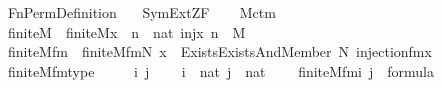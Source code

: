 %
\begin{isabellebody}%
%
%
\isadelimtheory
%
\endisadelimtheory
%
\isatagtheory
{}\isamarkupfalse%
\ Fn{\isacharunderscore}{\kern0pt}Perm{\isacharunderscore}{\kern0pt}Definition\isanewline
\ \ \ SymExt{\isacharunderscore}{\kern0pt}ZF\ \isanewline
{}%
\endisatagtheory
{\isafoldtheory}%
%
\isadelimtheory
\ \isanewline
%
\endisadelimtheory
\isanewline
{}\isamarkupfalse%
\ M{\isacharunderscore}{\kern0pt}ctm\ \ \isanewline
\isanewline
{}\isamarkupfalse%
\ finite{\isacharunderscore}{\kern0pt}M\ \ {\isachardoublequoteopen}finite{\isacharunderscore}{\kern0pt}M{\isacharparenleft}{\kern0pt}x{\isacharparenright}{\kern0pt}\ {\isasymequiv}\ {\isasymexists}n\ {\isasymin}\ nat{\isachardot}{\kern0pt}\ inj{\isacharparenleft}{\kern0pt}x{\isacharcomma}{\kern0pt}\ n{\isacharparenright}{\kern0pt}\ {\isasyminter}\ M\ {\isasymnoteq}\ {}{\isachardoublequoteclose}\ \ \isanewline
{}\isamarkupfalse%
\ finite{\isacharunderscore}{\kern0pt}M{\isacharunderscore}{\kern0pt}fm\ \ {\isachardoublequoteopen}finite{\isacharunderscore}{\kern0pt}M{\isacharunderscore}{\kern0pt}fm{\isacharparenleft}{\kern0pt}N{\isacharcomma}{\kern0pt}\ x{\isacharparenright}{\kern0pt}\ {\isasymequiv}\ Exists{\isacharparenleft}{\kern0pt}Exists{\isacharparenleft}{\kern0pt}And{\isacharparenleft}{\kern0pt}Member{\isacharparenleft}{\kern0pt}{}{\isacharcomma}{\kern0pt}\ N{\isacharhash}{\kern0pt}{\isacharplus}{\kern0pt}{}{\isacharparenright}{\kern0pt}{\isacharcomma}{\kern0pt}\ injection{\isacharunderscore}{\kern0pt}fm{\isacharparenleft}{\kern0pt}x{\isacharhash}{\kern0pt}{\isacharplus}{\kern0pt}{}{\isacharcomma}{\kern0pt}\ {}{\isacharcomma}{\kern0pt}\ {}{\isacharparenright}{\kern0pt}{\isacharparenright}{\kern0pt}{\isacharparenright}{\kern0pt}{\isacharparenright}{\kern0pt}{\isachardoublequoteclose}\isanewline
\isanewline
{}\isamarkupfalse%
\ finite{\isacharunderscore}{\kern0pt}M{\isacharunderscore}{\kern0pt}fm{\isacharunderscore}{\kern0pt}type\ {\isacharcolon}{\kern0pt}\ \isanewline
\ \ \ i\ j\ \isanewline
\ \ \ {\isachardoublequoteopen}i\ {\isasymin}\ nat{\isachardoublequoteclose}\ {\isachardoublequoteopen}j\ {\isasymin}\ nat{\isachardoublequoteclose}\ \isanewline
\ \ \ {\isachardoublequoteopen}finite{\isacharunderscore}{\kern0pt}M{\isacharunderscore}{\kern0pt}fm{\isacharparenleft}{\kern0pt}i{\isacharcomma}{\kern0pt}\ j{\isacharparenright}{\kern0pt}\ {\isasymin}\ formula{\isachardoublequoteclose}\ \isanewline

\end{isabellebody}
